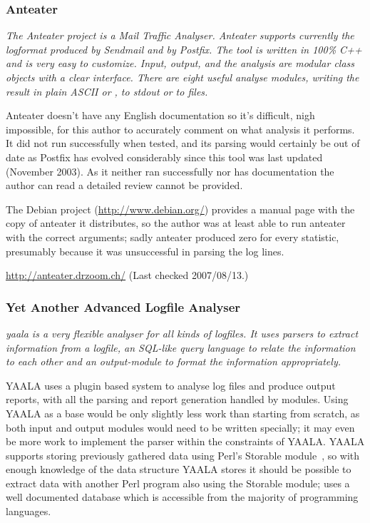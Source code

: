 \subsubsection{Anteater}

\textit{The Anteater project is a Mail Traffic Analyser. Anteater supports
currently the logformat produced by Sendmail and by Postfix. The tool is
written in 100\% C++ and is very easy to customize. Input, output, and the
analysis are modular class objects with a clear interface. There are eight
useful analyse modules, writing the result in plain ASCII or \HTML{}, to
stdout or to files.\/}

Anteater doesn't have any English documentation so it's difficult, nigh
impossible, for this author to accurately comment on what analysis it
performs.  It did not run successfully when tested, and its parsing would
certainly be out of date as Postfix has evolved considerably since this
tool was last updated (November 2003).  As it neither ran successfully nor
has documentation the author can read a detailed review cannot be provided.

The Debian project (\url{http://www.debian.org/}) provides a manual page
with the copy of anteater it distributes, so the author was at least able
to run anteater with the correct arguments; sadly anteater produced zero
for every statistic, presumably because it was unsuccessful in parsing the
log lines.

\url{http://anteater.drzoom.ch/} \newline (Last checked 2007/08/13.)

\subsubsection{Yet Another Advanced Logfile Analyser}

\textit{yaala is a very flexible analyser for all kinds of logfiles. It
uses parsers to extract information from a logfile, an SQL-like query
language to relate the information to each other and an output-module to
format the information appropriately.\/}

YAALA uses a plugin based system to analyse log files and produce \HTML{}
output reports, with all the parsing and report generation handled by
modules.  Using YAALA as a base would be only slightly less work than
starting from scratch, as both input and output modules would need to be
written specially; it may even be more work to implement the parser within
the constraints of YAALA\@.  YAALA supports storing previously gathered
data using Perl's Storable module~\cite{perl-storable}, so with enough
knowledge of the data structure YAALA stores it should be possible to
extract data with another Perl program also using the Storable module;
\parsername{} uses a well documented database which is accessible from the
majority of programming languages.

